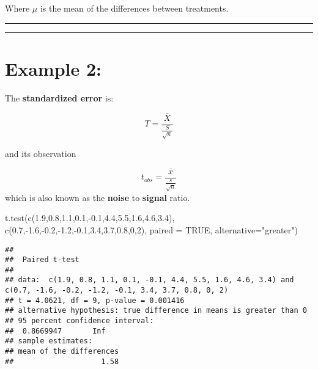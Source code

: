 \documentclass[
]{book}
\newenvironment{Shaded}{\begin{snugshade}}{\end{snugshade}}
\newcommand{\AttributeTok}[1]{\textcolor[rgb]{0.77,0.63,0.00}{#1}}
\newcommand{\ConstantTok}[1]{\textcolor[rgb]{0.00,0.00,0.00}{#1}}
\newcommand{\DecValTok}[1]{\textcolor[rgb]{0.00,0.00,0.81}{#1}}
\newcommand{\FloatTok}[1]{\textcolor[rgb]{0.00,0.00,0.81}{#1}}
\newcommand{\FunctionTok}[1]{\textcolor[rgb]{0.00,0.00,0.00}{#1}}
\newcommand{\NormalTok}[1]{#1}
\newcommand{\SpecialCharTok}[1]{\textcolor[rgb]{0.00,0.00,0.00}{#1}}
\newcommand{\StringTok}[1]{\textcolor[rgb]{0.31,0.60,0.02}{#1}}
\begin{document}
Where \(\mu\) is the mean of the differences between treatments.

\begin{center}\rule{0.5\linewidth}{0.5pt}\end{center}

\begin{center}\rule{0.5\linewidth}{0.5pt}\end{center}

\hypertarget{example-2-5}{%
\section{Example 2:}\label{example-2-5}}

The \textbf{standardized error} is:

\[T=\frac{\bar{X}}{\frac{S}{\sqrt{n}}}\]

and its observation

\[t_{obs}=\frac{\bar{x}}{\frac{s}{\sqrt{n}}}\]
which is also known as the \textbf{noise} to \textbf{signal} ratio.

\begin{Shaded}
\begin{Highlighting}[]
\FunctionTok{t.test}\NormalTok{(}\FunctionTok{c}\NormalTok{(}\FloatTok{1.9}\NormalTok{,}\FloatTok{0.8}\NormalTok{,}\FloatTok{1.1}\NormalTok{,}\FloatTok{0.1}\NormalTok{,}\SpecialCharTok{{-}}\FloatTok{0.1}\NormalTok{,}\FloatTok{4.4}\NormalTok{,}\FloatTok{5.5}\NormalTok{,}\FloatTok{1.6}\NormalTok{,}\FloatTok{4.6}\NormalTok{,}\FloatTok{3.4}\NormalTok{),}
       \FunctionTok{c}\NormalTok{(}\FloatTok{0.7}\NormalTok{,}\SpecialCharTok{{-}}\FloatTok{1.6}\NormalTok{,}\SpecialCharTok{{-}}\FloatTok{0.2}\NormalTok{,}\SpecialCharTok{{-}}\FloatTok{1.2}\NormalTok{,}\SpecialCharTok{{-}}\FloatTok{0.1}\NormalTok{,}\FloatTok{3.4}\NormalTok{,}\FloatTok{3.7}\NormalTok{,}\FloatTok{0.8}\NormalTok{,}\DecValTok{0}\NormalTok{,}\DecValTok{2}\NormalTok{),}
       \AttributeTok{paired =} \ConstantTok{TRUE}\NormalTok{,}
       \AttributeTok{alternative=}\StringTok{"greater"}\NormalTok{)}
\end{Highlighting}
\end{Shaded}

\begin{verbatim}
## 
##  Paired t-test
## 
## data:  c(1.9, 0.8, 1.1, 0.1, -0.1, 4.4, 5.5, 1.6, 4.6, 3.4) and c(0.7, -1.6, -0.2, -1.2, -0.1, 3.4, 3.7, 0.8, 0, 2)
## t = 4.0621, df = 9, p-value = 0.001416
## alternative hypothesis: true difference in means is greater than 0
## 95 percent confidence interval:
##  0.8669947       Inf
## sample estimates:
## mean of the differences 
##                    1.58
\end{verbatim}
\end{document}

